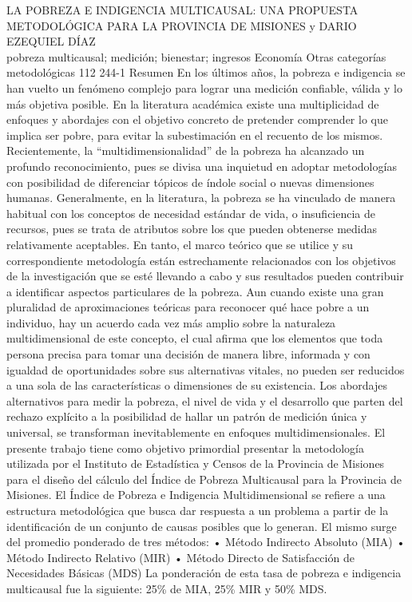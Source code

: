 \A
{LA POBREZA E INDIGENCIA MULTICAUSAL: UNA PROPUESTA METODOLÓGICA PARA LA PROVINCIA DE MISIONES}
{ y DARIO EZEQUIEL DÍAZ}
{
\\}
{pobreza multicausal; medición; bienestar; ingresos} 
 {Economía} 
 {Otras categorías metodológicas} 
 {112} 
 {244-1}
{Resumen En los últimos años, la pobreza e indigencia se han vuelto un fenómeno complejo para lograr una medición confiable, válida y lo más objetiva posible. En la literatura académica existe una multiplicidad de enfoques y abordajes con el objetivo concreto de pretender comprender lo que implica ser pobre, para evitar la subestimación en el recuento de los mismos. Recientemente, la “multidimensionalidad” de la pobreza ha alcanzado un profundo reconocimiento, pues se divisa una inquietud en adoptar metodologías con posibilidad de diferenciar tópicos de índole social o nuevas dimensiones humanas. Generalmente, en la literatura, la pobreza se ha vinculado de manera habitual con los conceptos de necesidad estándar de vida, o insuficiencia de recursos, pues se trata de atributos sobre los que pueden obtenerse medidas relativamente aceptables. En tanto, el marco teórico que se utilice y su correspondiente metodología están estrechamente relacionados con los objetivos de la investigación que se esté llevando a cabo y sus resultados pueden contribuir a identificar aspectos particulares de la pobreza. Aun cuando existe una gran pluralidad de aproximaciones teóricas para reconocer qué hace pobre a un individuo, hay un acuerdo cada vez más amplio sobre la naturaleza multidimensional de este concepto, el cual afirma que los elementos que toda persona precisa para tomar una decisión de manera libre, informada y con igualdad de oportunidades sobre sus alternativas vitales, no pueden ser reducidos a una sola de las características o dimensiones de su existencia. Los abordajes alternativos para medir la pobreza, el nivel de vida y el desarrollo que parten del rechazo explícito a la posibilidad de hallar un patrón de medición única y universal, se transforman inevitablemente en enfoques multidimensionales. El presente trabajo tiene como objetivo primordial presentar la metodología utilizada por el Instituto de Estadística y Censos de la Provincia de Misiones para el diseño del cálculo del Índice de Pobreza Multicausal para la Provincia de Misiones. El Índice de Pobreza e Indigencia Multidimensional se refiere a una estructura metodológica que busca dar respuesta a un problema a partir de la identificación de un conjunto de causas posibles que lo generan. El mismo surge del promedio ponderado de tres métodos: • Método Indirecto Absoluto (MIA) • Método Indirecto Relativo (MIR) • Método Directo de Satisfacción de Necesidades Básicas (MDS) La ponderación de esta tasa de pobreza e indigencia multicausal fue la siguiente: 25\% de MIA, 25\% MIR y 50\% MDS.}
